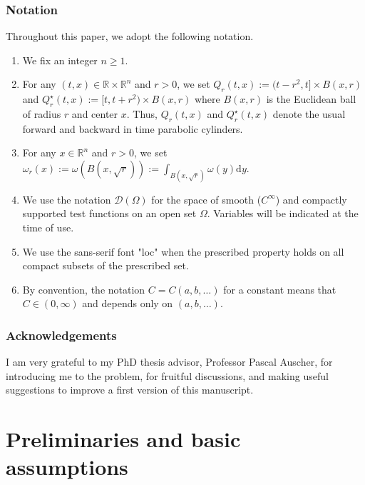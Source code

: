 \documentclass[12pt, letterpaper]{amsart}
\theoremstyle{definition}
\theoremstyle{remark}
\numberwithin{equation}{section}
\begin{document}
\subsubsection*{\textbf{Notation}}
Throughout this paper, we adopt the following notation.
\begin{enumerate}[label=$\blacklozenge$]
\item We fix an integer $n \ge 1$.
\item For any $(t,x) \in \mathbb{R} \times \mathbb{R}^n$ and $r>0$, we set $Q_r(t,x):=(t-r^2,t]\times B(x,r)$ and $Q_r^\star(t,x):=[t,t+r^2)\times B(x,r)$ where $B(x,r)$ is the Euclidean ball of radius $r$ and center $x$. Thus, $Q_r(t,x)$ and $Q_r^\star(t,x)$ denote the usual forward and backward in time parabolic cylinders.
\item For any $x \in \mathbb{R}^n$ and $r>0$, we set $\omega_r(x):=\omega(B(x,\sqrt{r})):=\int_{B(x,\sqrt{r})}\omega(y) \mathrm{d}y$.
\item We use the notation $\mathcal{D}(\Omega)$ for the space of smooth ($C^\infty$) and compactly supported test functions on an open set $\Omega$. Variables will be indicated at the time of use.
\item We use the sans-serif font "loc" when the prescribed property holds on all compact subsets of the prescribed set.
\item By convention, the notation $C = C(a,b,\dots)$ for a constant means that $ C \in (0, \infty)$ and depends only on $(a,b,\dots)$.
\end{enumerate}



\subsubsection*{\textbf{Acknowledgements}}
I am very grateful to my PhD thesis advisor, Professor Pascal Auscher, for introducing me to the problem, for fruitful discussions, and making useful suggestions to improve a first version of this manuscript.






\section{Preliminaries and basic assumptions}\label{section 2}
\end{document}
